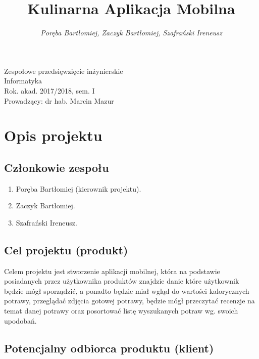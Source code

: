 \documentclass[a4paper]{article}
\title{\bf{Kulinarna Aplikacja Mobilna}}
\author{{\em Poręba Bartłomiej, Zaczyk Bartłomiej, Szafrański Ireneusz}}
\date{}
\begin{document}
	
	\begin{titlepage}
		\maketitle
		\thispagestyle{empty}
		\bigskip
		\begin{center}
			Zespołowe przedsięwzięcie inżynierskie\\[2mm]
			
			Informatyka\\[2mm]
			
			Rok. akad. 2017/2018, sem. I\\[2mm]
			
			Prowadzący: dr hab. Marcin Mazur
		\end{center}
	\end{titlepage}
	
	\tableofcontents
	\thispagestyle{empty}
	
	\newpage
	
	\section{Opis projektu}
	
	\subsection{Członkowie zespołu}
	
	\begin{enumerate}
		\item Poręba Bartłomiej (kierownik projektu).
		\item Zaczyk Bartłomiej.
		\item Szafrański Ireneusz.
	\end{enumerate}
	
	\subsection{Cel projektu (produkt)}
	
	Celem projektu jest stworzenie aplikacji mobilnej, która na podstawie posiadanych przez użytkownika produktów znajdzie danie które użytkownik będzie mógł sporządzić, a ponadto będzie miał wgląd do wartości kalorycznych potrawy, przeglądać zdjęcia gotowej potrawy, będzie mógł przeczytać recenzje na temat danej potrawy oraz posortować listę wyszukanych potraw wg. swoich upodobań.
	
	\subsection{Potencjalny odbiorca produktu (klient)}
	
\end{document}

